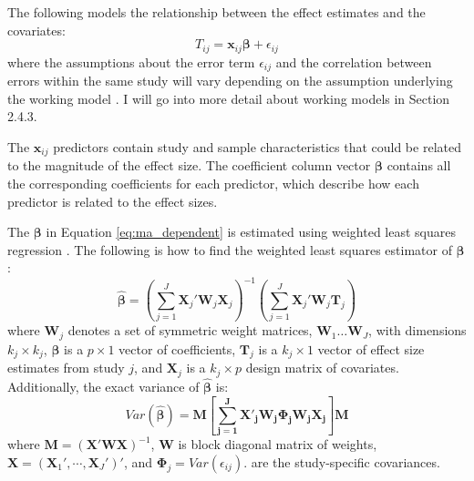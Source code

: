 The following models the relationship between the effect estimates and the covariates:
\begin{equation}\label{eq:ma_dependent}
    T_{ij} = \mathbf{x}_{ij}\boldsymbol{\beta} + \epsilon_{ij}
\end{equation}
where the assumptions about the error term $\epsilon_{ij}$ and the correlation between errors within the same study will vary depending on the assumption underlying the working model \autocite{pustejovsky2022}. I will go into more detail about working models in Section 2.4.3. 




The $\mathbf{x}_{ij}$ predictors contain study and sample characteristics that could be related to the magnitude of the effect size. The coefficient column vector $\bm{\beta}$ contains all the corresponding coefficients for each predictor, which describe how each predictor is related to the effect sizes. 

The $\bm{\beta} $ in Equation \ref{eq:ma_dependent} is estimated using weighted least squares regression \autocite{tipton2015b}. The following is how to find the weighted least squares estimator of $\bm{\beta}$:
\begin{equation}\label{eq:beta_est}
    \bm{\hat{\beta}} = \left( \sum_{j=1}^J \mathbf{X}_j' \mathbf{W}_j \mathbf{X}_j \right)^{-1} \left(\sum_{j=1}^J \mathbf{X}_j' \mathbf{W}_j \mathbf{T}_j   \right)
\end{equation}
where $\mathbf{W}_j$ denotes a set of symmetric weight matrices, $\mathbf{W}_1 \dots \mathbf{W}_J$, with dimensions $k_j \times k_j$, $\boldsymbol{\beta}$ is a $p \times 1$ vector of coefficients, $\mathbf{T}_j$ is a $k_j \times 1$ vector of effect size estimates from study $j$, and $\mathbf{X}_j$ is a $k_j \times p$ design matrix of covariates. Additionally, the exact variance of $\bm{\hat{\beta}}$ is:
\begin{equation}
    Var(\bm{\hat{\beta}}) = \mathbf{M \left[\sum_{j=1}^J\mathbf{X}'_j\mathbf{W}_j\mathbf{\Phi}_j\mathbf{W}_j\mathbf{X}_j \right]}\mathbf{M}
\end{equation}
where $\mathbf{M}= (\mathbf{X}'\mathbf{W}\mathbf{X})^{-1}$,  $\mathbf{W}$ is block diagonal matrix of weights, $\mathbf{X} = ( \mathbf{X}_1', \cdots, \mathbf{X}_J')'$, and $\mathbf{\Phi}_j = Var(\epsilon_{ij}).$ are the study-specific covariances.

